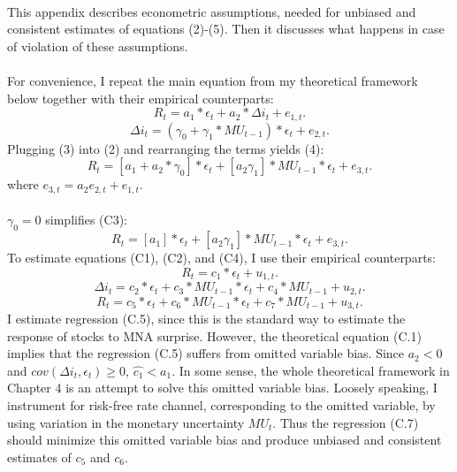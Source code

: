 \documentclass[12pt]{article}
\begin{document}
\paragraph{}
This appendix describes econometric assumptions, needed for unbiased and consistent estimates of equations (2)-(5). Then it discusses what happens in case of violation of these assumptions.
\paragraph{}
For convenience, I repeat the main equation from my theoretical framework below together with their empirical counterparts:
\begin{equation}
    R_t = a_1*\epsilon_t + a_2*\Delta i_t + e_{1,t}.
\end{equation}
\begin{equation}
    \Delta i_t = (\gamma_0 + \gamma_1*MU_{t-1})*\epsilon_t + e_{2,t}.
\end{equation}
Plugging (3) into (2) and rearranging the terms yields (4):
\begin{equation}
    R_t = [a_1+a_2*\gamma_0]*\epsilon_t + [a_2\gamma_1]*MU_{t-1}*\epsilon_t + e_{3,t}.
\end{equation}
where $e_{3,t} = a_2e_{2,t}+e_{1,t}.$ 
\paragraph{}
$\gamma_0=0$ simplifies (C3):
\begin{equation}
    R_t = [a_1]*\epsilon_t + [a_2\gamma_1]*MU_{t-1}*\epsilon_t + e_{3,t}.
\end{equation}
To estimate equations (C1), (C2), and (C4), I use their empirical counterparts:
\begin{equation}
    R_t = c_1*\epsilon_t + u_{1,t}.
\end{equation}
\begin{equation}
    \Delta i_t = c_2*\epsilon_t + c_3*MU_{t-1}*\epsilon_t + c_4*MU_{t-1} + u_{2,t}.
\end{equation}
\begin{equation}
    R_t = c_5*\epsilon_t + c_6*MU_{t-1}*\epsilon_t + c_7*MU_{t-1} + u_{3,t}.
\end{equation}
I estimate regression (C.5), since this is the standard way to estimate the response of stocks to MNA surprise. However, the theoretical equation (C.1) implies that the regression (C.5) suffers from omitted variable bias. Since $a_2 < 0$ and $cov(\Delta i_{t}, \epsilon_t) \ge 0$, $\hat{c_1}<a_1$. In some sense, the whole theoretical framework in Chapter 4 is an attempt to solve this omitted variable bias. Loosely speaking, I instrument for risk-free rate channel, corresponding to the omitted variable, by using variation in the monetary uncertainty $MU_t$. Thus the regression (C.7) should minimize this omitted variable bias and produce unbiased and consistent estimates of $c_5$ and $c_6$.
\end{document}
